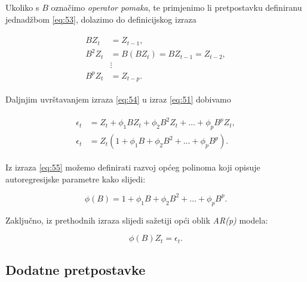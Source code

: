 \documentclass[a4paper,12pt,oneside]{memoir}
\begin{document}
            Ukoliko s $B$ označimo \textit{operator pomaka}, te primjenimo li pretpostavku definiranu jednadžbom \ref{eq:53}, dolazimo do definicijskog izraza

            \begin{align}
                \begin{split}
                    BZ_t&=Z_{t-1},\\
                    B^2Z_t&=B(BZ_t)=BZ_{t-1}=Z_{t-2},\\
                    &\vdots\\
                    B^pZ_t&=Z_{t-p}.
                \end{split}
                \label{eq:54}
            \end{align}

            Daljnjim uvrštavanjem izraza \ref{eq:54} u izraz \ref{eq:51} dobivamo

            \begin{align}
                \begin{split}
                    \epsilon_t&=Z_t+\phi_1BZ_t+\phi_2B^2Z_t+\ldots+\phi_pB^pZ_t,\\
                    \epsilon_t&=Z_t(1+\phi_1B+\phi_2B^2+\ldots+\phi_pB^p).
                \end{split}
                \label{eq:55}
            \end{align}

            
        
            Iz izraza \ref{eq:55} možemo definirati razvoj općeg polinoma koji opisuje autoregresijske parametre kako slijedi:

            \begin{equation}
                \phi(B)=1+\phi_1B+\phi_2B^2+\ldots+\phi_pB^p.
                \label{eq:56}
            \end{equation}

            Zaključno, iz prethodnih izraza slijedi sažetiji opći oblik \textit{AR(p)} modela:

            \begin{equation}
                \phi(B)Z_t=\epsilon_t.
                \label{eq:57}
            \end{equation}

            \subsection{Dodatne pretpostavke}
            
\end{document}
